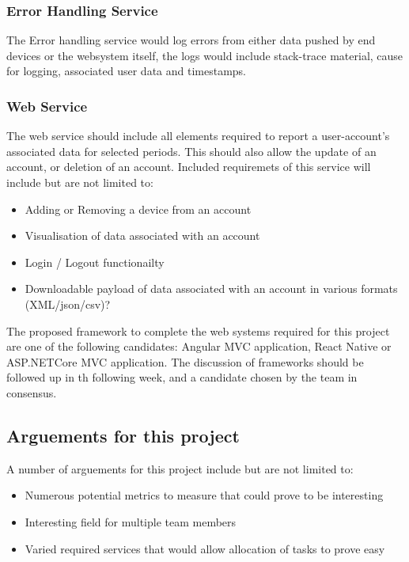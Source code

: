 \documentclass{article}
\begin{document}
            \subsubsection{Error Handling Service}
            The Error handling service would log errors from either data pushed by end devices or the websystem itself,
            the logs would include stack-trace material, cause for logging, associated user data and timestamps.

            \subsubsection{Web Service}
            The web service should include all elements required to report a user-account's associated data
            for selected periods. This should also allow the update of an account, or deletion of an account.
            Included requiremets of this service will include but are not limited to:
            \begin{itemize}
                \item Adding or Removing a device from an account
                \item Visualisation of data associated with an account
                \item Login / Logout functionailty
                \item Downloadable payload of data associated with an account in various formats (XML/json/csv)?
            \end{itemize}
            \par
            The proposed framework to complete the web systems required for this project are one of the following 
            candidates: Angular MVC application\cite{Angular}, React Native\cite{ReactNative} or ASP.NETCore MVC 
            application\cite{ASP.NETcore-MVC}.
            The discussion of frameworks should be followed up in th following week, and a candidate chosen
            by the team in consensus.
            
            \newpage

            \subsection{Arguements for this project}
            A number of arguements for this project include but are not limited to:
            \begin{itemize}
                \item Numerous potential metrics to measure that could prove to be interesting
                \item Interesting field for multiple team members
                \item Varied required services that would allow allocation of tasks to prove easy
            \end{itemize}
\end{document}
